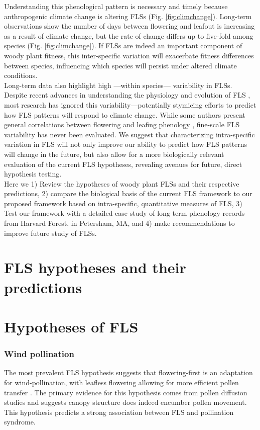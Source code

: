 \documentclass{article}
\begin{document}
\noindent Understanding this phenological pattern is necessary and timely because anthropogenic climate change is altering FLSs (Fig. \ref{fig:climchange}). Long-term observations show the number of days between flowering and leafout is increasing as a result of climate change, but the rate of change differs up to five-fold among species (Fig. \ref{fig:climchange}).  If FLSs are indeed an important component of woody plant fitness, this inter-specific variation will exacerbate fitness differences between species, influencing which species will persist under altered climate conditions.\\

\noindent Long-term data also highlight high ---within species--- variability in FLSs. Despite recent advances in understanding the physiology and evolution of FLS \citep{Gougherty2018,Savage2019}, most research has ignored this variability---potentially stymieing efforts to predict how FLS patterns will respond to climate change. While some authors present general correlations between flowering and leafing phenology \citep{Lechowicz_1995, Ettinger2018}, fine-scale FLS variability has never been evaluated. We suggest that characterizing intra-specific variation in FLS will not only improve our ability to predict how FLS patterns will change in the future, but also allow for a more biologically relevant evaluation of the current FLS hypotheses, revealing avenues for future, direct hypothesis testing.\\

\noindent Here we 1) Review the hypotheses of woody plant FLSs and their respective predictions, 2) compare the biological basis of the current FLS framework to our proposed framework based on intra-specific, quantitative measures of FLS, 3) Test our framework with a detailed case study of long-term phenology records from Harvard Forest, in Petersham, MA, and 4) make recommendations to improve future study of FLSs.
\section*{FLS hypotheses and their predictions}
\section*{Hypotheses of FLS}
\subsubsection*{ Wind pollination}
\noindent The most prevalent FLS hypothesis suggests that flowering-first is an adaptation for wind-pollination, with leafless flowering allowing for more efficient pollen transfer \citep{Whitehead1969, Spurr1980,Friedman2009}. The primary evidence for this hypothesis comes from pollen diffusion studies \citep[e.g., particle movement through closed and open canopies][]{Niklas1985,Nathan2005, Milleron2012} and suggests canopy structure does indeed encumber pollen movement. This hypothesis predicts a strong association between FLS and pollination syndrome.
\end{document}
